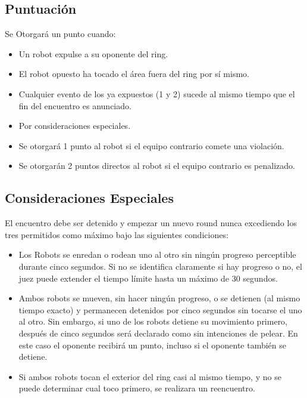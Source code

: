 \documentclass[12pt]{book}
\theoremstyle{definition}
\theoremstyle{remark}
\theoremstyle{plain}
\begin{document}
\subsection{Puntuación}
Se Otorgará un punto cuando: 
\begin{itemize}
 \item Un robot expulse a su oponente del ring. 
 \item El robot opuesto ha tocado el área fuera del ring por sí mismo. 
 \item Cualquier evento de los ya expuestos (1 y 2) sucede al mismo tiempo que el fin del encuentro es anunciado. 
 \item Por consideraciones especiales. 
 \item Se otorgará 1 punto al robot si el equipo contrario comete una violación. 
 \item Se otorgarán 2 puntos directos al robot si el equipo contrario es penalizado.
\end{itemize}

\subsection{Consideraciones Especiales}

El encuentro debe ser detenido y empezar un nuevo round nunca excediendo los tres permitidos como máximo bajo las siguientes condiciones: 

\begin{itemize}
 \item Los Robots se enredan o rodean uno al otro sin ningún progreso perceptible durante cinco segundos. Si no se identifica claramente
 si hay progreso o no, el juez puede extender el tiempo límite hasta un máximo de 30 segundos. 
 \item Ambos robots se mueven, sin hacer ningún progreso, o se detienen (al mismo tiempo exacto) y permanecen detenidos por cinco segundos sin tocarse el uno al otro. 
Sin embargo, si uno de los robots detiene su movimiento primero, después de cinco segundos será declarado como sin intenciones de pelear. En este caso el oponente 
recibirá un punto, incluso si el oponente también se detiene. 
 \item Si ambos robots tocan el exterior del ring casi al mismo tiempo, y no se puede determinar cual toco primero, se realizara un reencuentro. 
\end{itemize}
\end{document}
